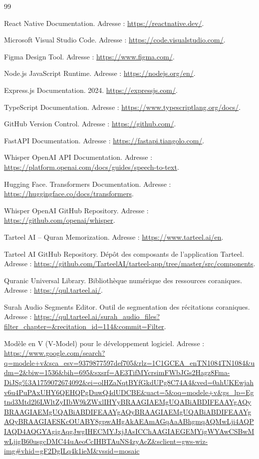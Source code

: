 \label{sec:bibliographie}

\begin{thebibliography}{99}

 React Native Documentation. Adresse : \url{https://reactnative.dev/}.

 Microsoft Visual Studio Code. Adresse : \url{https://code.visualstudio.com/}.

 Figma Design Tool. Adresse : \url{https://www.figma.com/}.

 Node.js JavaScript Runtime. Adresse : \url{https://nodejs.org/en/}.

 Express.js Documentation. 2024. \url{https://expressjs.com/}.

 TypeScript Documentation. Adresse : \url{https://www.typescriptlang.org/docs/}.

 GitHub Version Control. Adresse : \url{https://github.com/}.

 FastAPI Documentation. Adresse : \url{https://fastapi.tiangolo.com/}.

 Whisper OpenAI API Documentation. Adresse : \url{https://platform.openai.com/docs/guides/speech-to-text}.


 Hugging Face. Transformers Documentation. Adresse : \url{https://huggingface.co/docs/transformers}.

 Whisper OpenAI GitHub Repository. Adresse : \url{https://github.com/openai/whisper}.

 Tarteel AI – Quran Memorization. Adresse : \url{https://www.tarteel.ai/en}.

 Tarteel AI GitHub Repository. Dépôt des composants de l'application Tarteel. Adresse : \url{https://github.com/TarteelAI/tarteel-app/tree/master/src/components}.

 Quranic Universal Library. Bibliothèque numérique des ressources coraniques. Adresse : \url{https://qul.tarteel.ai/}.

 Surah Audio Segments Editor. Outil de segmentation des récitations coraniques. Adresse : \url{https://qul.tarteel.ai/surah_audio_files?filter_chapter=&recitation_id=114&commit=Filter}.

 Modèle en V (V-Model) pour le développement logiciel. Adresse : \url{https://www.google.com/search?q=modele+v&sca_esv=9379877597def705&rlz=1C1GCEA_enTN1084TN1084&udm=2&biw=1536&bih=695&sxsrf=AE3TifMYcrsimFWbJGs2Hagz8Fma-DiJSg%3A1759072674092&ei=olHZaNqtBYfGkdUPg8C74A4&ved=0ahUKEwjahv6u4PuPAxUHY6QEHQPgDuwQ4dUDCBE&uact=5&oq=modele+v&gs_lp=Egtnd3Mtd2l6LWltZyIIbW9kZWxlIHYyBRAAGIAEMgUQABiABDIFEAAYgAQyBRAAGIAEMgUQABiABDIFEAAYgAQyBRAAGIAEMgUQABiABDIFEAAYgAQyBRAAGIAESKcOUABY8gpwAHgAkAEAmAGqAaABhgmqAQMwLji4AQPIAQD4AQGYAgigAqgJwgIHECMYJxjJAsICChAAGIAEGEMYigWYAwCSBwMwLjigB60usgcDMC44uAeoCcIHBTAuNS4zyAcZ&sclient=gws-wiz-img#vhid=gF2DgILq4k1ieM&vssid=mosaic}


\end{thebibliography}
